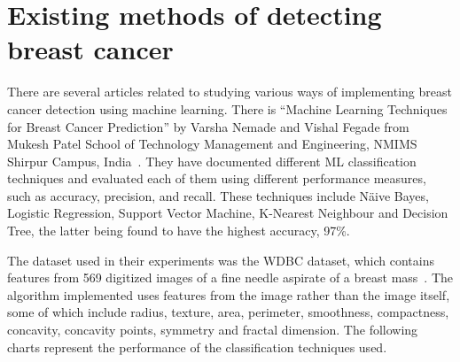 \chapter{Existing methods of detecting breast cancer}
\label{chap:ch2}

\par There are several articles related to studying various ways of implementing breast cancer detection using machine learning. There is “Machine Learning Techniques for Breast Cancer Prediction” by Varsha Nemade and Vishal Fegade from Mukesh Patel School of Technology Management and Engineering, NMIMS Shirpur Campus, India~\cite{carte2}. They have documented different ML classification techniques and evaluated each of them using different performance measures, such as accuracy, precision, and recall. These techniques include N{\"a}ive Bayes, Logistic Regression, Support Vector Machine, K-Nearest Neighbour and Decision Tree, the latter being found to have the highest accuracy, 97\%.

The dataset used in their experiments was the WDBC dataset, which contains features from 569 digitized images of a fine needle aspirate of a breast mass~\cite{link3}. The algorithm implemented uses features from the image rather than the image itself, some of which include radius, texture, area, perimeter, smoothness, compactness, concavity, concavity points, symmetry and fractal dimension. The following charts represent the performance of the classification techniques used.

